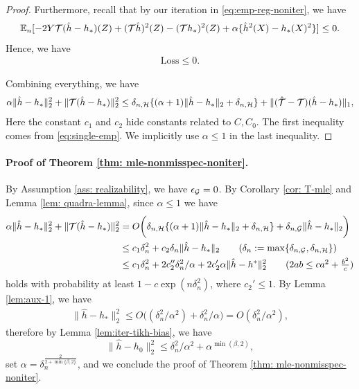 \begin{proof}
Furthermore, recall that by our iteration in \eqref{eq:emp-reg-noniter}, we have
\begin{align*}
     \mathbb{E}_n[  - 2 Y  {\mathcal{T}} (\hat{h}-h_*)(Z)  + ({\mathcal{T}} \hat h)^2(Z) - ({\mathcal{T}} h_*)^2(Z)+ \alpha\{\hat h^2(X)- h_*(X)^2 \} ]\leq 0. 
\end{align*}
Hence, we have 
\begin{align}\label{eq:single-loss}
    \mathrm{Loss}\leq 0. 
\end{align}

Combining everything, we have 
\begin{align}\label{eq: useful}
    \alpha \|\hat h - h_* \|^2_2 + \|{\mathcal{T}}(\hat h-h_*)\|^2_2 \leq \delta_{n,\mathcal{H}}\{ (\alpha+1) \|\hat h-h_*\|_2 +   \delta_{n,\mathcal{H}}   \}+  \|(\hat {{\mathcal{T}}}-{\mathcal{T}})(\hat h-h_*)\|_1, 
\end{align}
Here the constant $c_1$ and $c_2$ hide constants related to $C, C_0$. The first inequality comes from \eqref{eq:single-emp}. We implicitly use $ \alpha \leq 1$ in the last inequality. 
\end{proof}
\paragraph{Proof of Theorem \ref{thm: mle-nonmisspec-noniter}.} By Assumption \ref{ass: realizability}, we have $\epsilon_{\mathcal{G}} = 0$. By Corollary \ref{cor: T-mle} and Lemma \ref{lem: quadra-lemma},  since $\alpha\leq 1$ we have \begin{align*}
      \alpha \|\hat h - h_* \|^2_2 + \|\Tcal(\hat h-h_*)\|^2_2&= O\bigg(\delta_{n,\Hcal}\{ (\alpha+1) \|\hat h-h_*\|_{2} +   \delta_{n,\Hcal}   \}+  \delta_{n,\Gcal} \|\hat{h} - h_*\|_2\bigg) \nonumber\\
     &\leq c_1 \delta^2_n  + c_2 \delta_n\|\hat{h} - h_*\|_2 \tag{$\delta_n := \max\{\delta_{n,\Gcal}, \delta_{n,\Hcal}\}$}\\
     &\leq c_1\delta_n^2 +2c_2''\delta_n^2/\alpha + 2c_2'\alpha\|\hat{h} - h^*\|_2^2 \tag{$2ab \leq ca^2 + \frac{b^2}{c}$}
\end{align*}
holds with probability at least $1 - c\exp(n\delta_n^2)$, where $c_2'\leq 1$.
By Lemma \ref{lem:aux-1}, we have 
\begin{align*}
\|\hat h - h_* \|^2_2 \leq  O( (\delta_n^2 / \alpha^2)  + \delta_n^2 / \alpha \big) = O(\delta_{n}^2 / \alpha^2), \tag{$\alpha \leq 1$}
\end{align*}
therefore by Lemma \ref{lem:iter-tikh-bias}, we have $$
    \|\hat h-h_0 \|^2_2\leq  \delta_{n}^2 / \alpha^2+ \alpha^{\min(\beta,2)} ,
$$
set $\alpha = \delta_n^{\frac{2}{2+\min\{\beta, 2\}}}$, and we conclude the proof of Theorem \ref{thm: mle-nonmisspec-noniter}.
